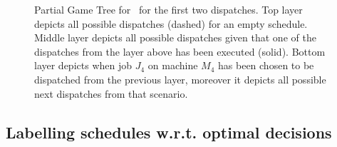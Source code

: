 \begin{figure}
  
  \caption[Partial Game Tree for \jsp]{Partial Game Tree for \jsp\ for the 
    first two dispatches. 
    Top layer depicts all possible dispatches (dashed) for an empty schedule. 
    Middle layer depicts all possible dispatches given that one of the 
    dispatches from the layer above has been executed (solid). 
    Bottom layer depicts when job $J_4$ on machine $M_4$ has been chosen to be 
    dispatched from the previous layer, moreover it depicts all possible next 
    dispatches from that scenario.}
  \label{fig:jssp:gametree}
\end{figure}

\subsection{Labelling schedules w.r.t. optimal 
decisions}\label{sec:gentrdat:labelling}